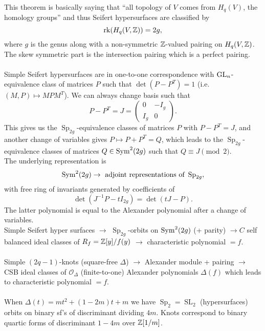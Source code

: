 \documentclass[12pt,amsfont]{amsart}
\begin{document}
This theorem is basically saying that ``all topology of $V$ comes from $H_q(V)$, the homology groups'' and thus Seifert hypersurfaces are classified by 
\[
\operatorname{rk}(H_q(V, {\mathbb Z})) = 2g,
\]
where $g$ is the genus along with a non-symmetric ${\mathbb Z}$-valued pairing on $H_q(V, {\mathbb Z})$. The skew symmetric part is the intersection pairing which is a perfect pairing. \\ \\
Simple Seifert hypersurfaces are in one-to-one correspondence with $\operatorname{GL}_n$-equivalence class of matrices $P$ such that $\det(P - P^T) = 1$ (i.e. $(M,P) \mapsto MPM^T$). We can always change basis such that 
\[
P - P^T = J = \begin{pmatrix} 0 & -I_g \\ I_g & 0 \end{pmatrix}.
\]
This gives us the $\operatorname{Sp}_{2g}$-equivalence classes of matrices $P$ with $P - P^T = J$, and another change of variables gives $P \mapsto P + P^T = Q$, which leads to the $\operatorname{Sp}_{2g}$-equivalence classes of matrices $Q \in \operatorname{Sym}^2(2g)$ such that $Q \equiv J \pmod{2}$. \\
The underlying representation is 
\[
\operatorname{Sym}^2(2g) \rightarrow \text{ adjoint representations of } \operatorname{Sp}_{2g},
\]
with free ring of invariants generated by coefficients of 
\[ 
\det(J^{-1} P - t I_{2g}) = \det(tJ - P).
\]
The latter polynomial is equal to the Alexander polynomial after a change of variables. \\ 
Simple Seifert hyper surfaces $\rightarrow$ $\operatorname{Sp}_{2g}$-orbits on $\operatorname{Sym}^2(2g)$ (+ parity) $\rightarrow C$ self balanced ideal classes of $R_f = {\mathbb Z}[y]/f(y)$ $\rightarrow$ characteristic polynomial $= f$. \\ \\
Simple $(2q-1)$-knots (square-free $\Delta$) $\rightarrow$ Alexander module + pairing $\rightarrow$ CSB ideal classes of $\mathcal{O}_\Delta$ (finite-to-one) Alexander polynomials $\Delta(f)$ which leads to characteristic polynomial $=f$. \\ \\
When $\Delta(t) = mt^2 + (1-2m)t + m$ we have $\operatorname{Sp}_2 = \operatorname{SL}_2$ (hypersurfaces) orbits on binary sf's of discriminant dividing $4m$. Knots correspond to binary quartic forms of discriminant $1 - 4m$ over ${\mathbb Z}[1/m]$. 

\renewcommand{\thesubsection}{\arabic{section}.R}
\begingroup
\renewcommand{\addcontentsline}[3]{}%
\endgroup
\end{document}

